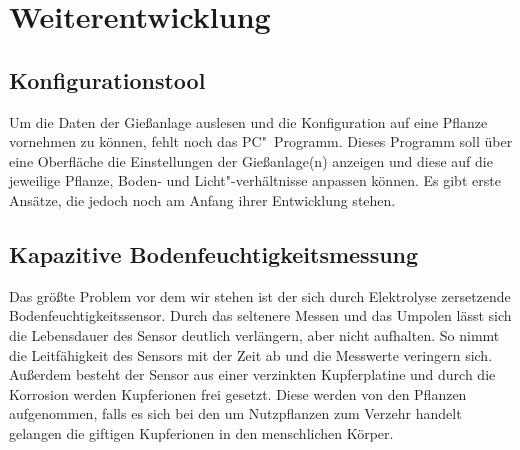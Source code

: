 
\section{Weiterentwicklung}
\subsection{Konfigurationstool}
Um die Daten der Gießanlage auslesen und die Konfiguration auf eine Pflanze vornehmen zu können, fehlt noch das PC"~Programm. 
Dieses Programm soll über eine Oberfläche die Einstellungen der Gießanlage(n) anzeigen und diese auf die jeweilige Pflanze, Boden- und Licht"-verhältnisse anpassen können.
Es gibt erste Ansätze, die jedoch noch am Anfang ihrer Entwicklung stehen.

\subsection{Kapazitive Bodenfeuchtigkeitsmessung}
Das größte Problem vor dem wir stehen ist der sich durch Elektrolyse zersetzende Bodenfeuchtigkeitssensor.
Durch das seltenere Messen und das Umpolen lässt sich die Lebensdauer des Sensor deutlich verlängern, aber nicht aufhalten.
So nimmt die Leitfähigkeit des Sensors mit der Zeit ab und die Messwerte veringern sich.
Außerdem besteht der Sensor aus einer verzinkten Kupferplatine und durch die Korrosion werden Kupferionen frei gesetzt. 
Diese werden von den Pflanzen aufgenommen, falls es sich bei den um Nutzpflanzen zum Verzehr handelt gelangen die giftigen Kupferionen in den menschlichen Körper.
 